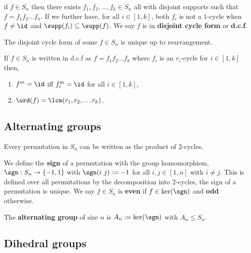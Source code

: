 \documentclass[../Year1/Year1.tex]{subfiles}
\begin{document}
\begin{theorem}
    if $f\in S_n$ then there exists $f_1,f_2,\ldots,f_k\in S_n$ all with disjoint supports such that $f=f_1f_2\ldots f_n$. If we further have, for all $i\in[1,k]$, both $f_i$ is not a $1$-cycle when $f\neq \id$ and $\supp(f_i)\subseteq\supp(f)$. We say $f$ is in \textbf{disjoint cycle form} or \textbf{d.c.f}.
\end{theorem}

\begin{theorem}
    The disjoint cycle form of some $f\in S_n$ is unique up to rearrangement.
\end{theorem}

\begin{theorem}
    If $f\in S_n$ is written in d.c.f as $f=f_1f_2\ldots f_k$ where $f_i$ is an $r_i$-cycle for $i\in[1,k]$ then, \begin{enumerate}
        \item $f^m=\id$ iff $f_i^m=\id$ for all $i\in[1,k]$,
        \item $\ord(f) = \lcm(r_1,r_2,\ldots r_k)$.
    \end{enumerate}
\end{theorem}

\subsection{Alternating groups}

\begin{theorem}
    Every permutation in $S_n$ can be written as the product of $2$-cycles.
\end{theorem}

\begin{definition}
    We define the \textbf{sign} of a permutation with the group homomorphism, $\sgn:S_n\rightarrow\{-1,1\}$ with $\sgn(i \ j) := -1$ for all $i,j\in[1,n]$ with $i\neq j$. This is defined over all permutations by the decomposition into $2$-cycles, the sign of a permutation is unique. We say $f\in S_n$ is \textbf{even} if $f\in\ker(\sgn)$ and \textbf{odd} otherwise.
\end{definition}

\begin{definition}
    The \textbf{alternating group} of size $n$ is $A_n := \ker(\sgn)$ with $A_n\leq S_n$.
\end{definition}

\subsection{Dihedral groups}
\end{document}
